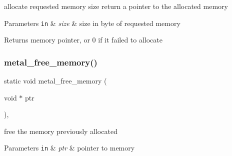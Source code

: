 allocate requested memory size return a pointer to the allocated memory 


\begin{DoxyParams}[1]{Parameters}
\mbox{\tt in}  & {\em size} & size in byte of requested memory \\
\hline
\end{DoxyParams}
\begin{DoxyReturn}{Returns}
memory pointer, or 0 if it failed to allocate 
\end{DoxyReturn}
\mbox{\label{group___memory_gacfe3e374cb2e273fa55c0b07022bc9db}} 
\subsubsection{\texorpdfstring{metal\+\_\+free\+\_\+memory()}{metal\_free\_memory()}}
{\footnotesize\ttfamily static void metal\+\_\+free\+\_\+memory (\begin{DoxyParamCaption}\item[{void $\ast$}]{ptr }\end{DoxyParamCaption})\hspace{0.3cm}{\ttfamily [inline]}, {\ttfamily [static]}}



free the memory previously allocated 


\begin{DoxyParams}[1]{Parameters}
\mbox{\tt in}  & {\em ptr} & pointer to memory \\
\hline
\end{DoxyParams}
